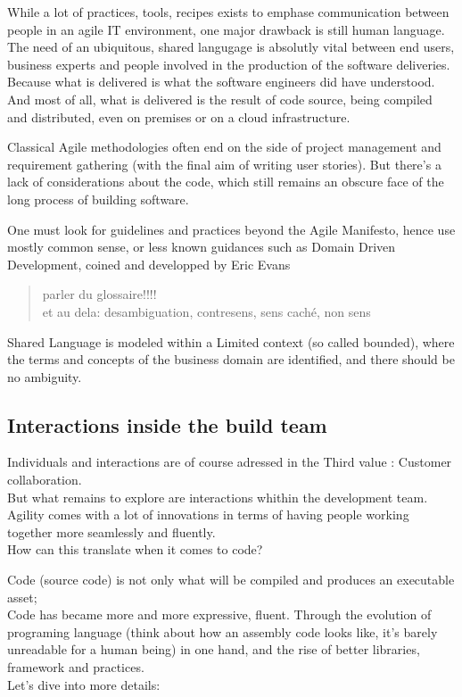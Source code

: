 While a lot of practices, tools, recipes exists to emphase communication
between people in an agile IT environment, one major drawback is still
human language.\\The need of an ubiquitous, shared langugage is
absolutly vital between end users, business experts and people involved
in the production of the software deliveries.\\Because what is delivered
is what the software engineers did have understood.\\And most of all,
what is delivered is the result of code source, being compiled and
distributed, even on premises or on a cloud infrastructure.

Classical Agile methodologies often end on the side of project
management and requirement gathering (with the final aim of writing user
stories). But there's a lack of considerations about the code, which
still remains an obscure face of the long process of building software.

One must look for guidelines and practices beyond the Agile Manifesto,
hence use mostly common sense, or less known guidances such as Domain
Driven Development, coined and developped by Eric Evans

\begin{quote}
parler du glossaire!!!!\\et au dela: desambiguation, contresens, sens
caché, non sens
\end{quote}

Shared Language is modeled within a Limited context (so called bounded),
where the terms and concepts of the business domain are identified, and
there should be no ambiguity.

\subsection{Interactions inside the build
team}\label{interactions-inside-the-build-team}

Individuals and interactions are of course adressed in the Third value :
Customer collaboration.\\But what remains to explore are interactions
whithin the development team.\\Agility comes with a lot of innovations
in terms of having people working together more seamlessly and
fluently.\\How can this translate when it comes to code?

Code (source code) is not only what will be compiled and produces an
executable asset;\\Code has became more and more expressive, fluent.
Through the evolution of programing language (think about how an
assembly code looks like, it's barely unreadable for a human being) in
one hand, and the rise of better libraries, framework and
practices.\\Let's dive into more details:

